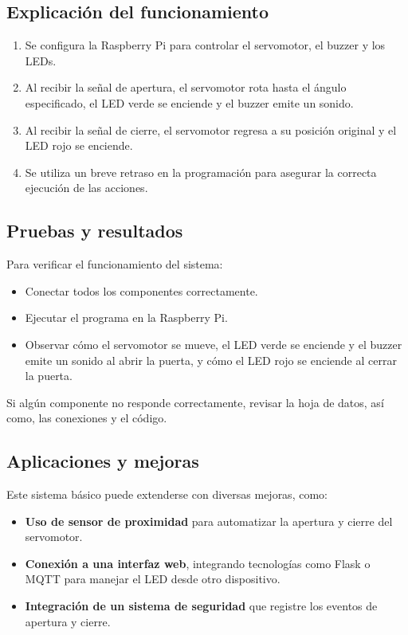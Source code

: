 \subsection{Explicación del funcionamiento}
\begin{enumerate}
	\item Se configura la Raspberry Pi para controlar el servomotor, el buzzer y los LEDs.
	\item Al recibir la señal de apertura, el servomotor rota hasta el ángulo especificado, el LED verde se enciende y el buzzer emite un sonido.
	\item Al recibir la señal de cierre, el servomotor regresa a su posición original y el LED rojo se enciende.
	\item Se utiliza un breve retraso en la programación para asegurar la correcta ejecución de las acciones.
\end{enumerate}

\subsection{Pruebas y resultados}
Para verificar el funcionamiento del sistema:
\begin{itemize}
	\item Conectar todos los componentes correctamente.
	\item Ejecutar el programa en la Raspberry Pi.
	\item Observar cómo el servomotor se mueve, el LED verde se enciende y el buzzer emite un sonido al abrir la puerta, y cómo el LED rojo se enciende al cerrar la puerta.
\end{itemize}

Si algún componente no responde correctamente, revisar la hoja de datos, así como, las conexiones y el código.

\subsection{Aplicaciones y mejoras}
Este sistema básico puede extenderse con diversas mejoras, como:
\begin{itemize}
	\item \textbf{Uso de sensor de proximidad} para automatizar la apertura y cierre del servomotor.
	\item \textbf{Conexión a una interfaz web}, integrando tecnologías como Flask o MQTT para manejar el LED desde otro dispositivo.
	\item \textbf{Integración de un sistema de seguridad} que registre los eventos de apertura y cierre.
\end{itemize}

